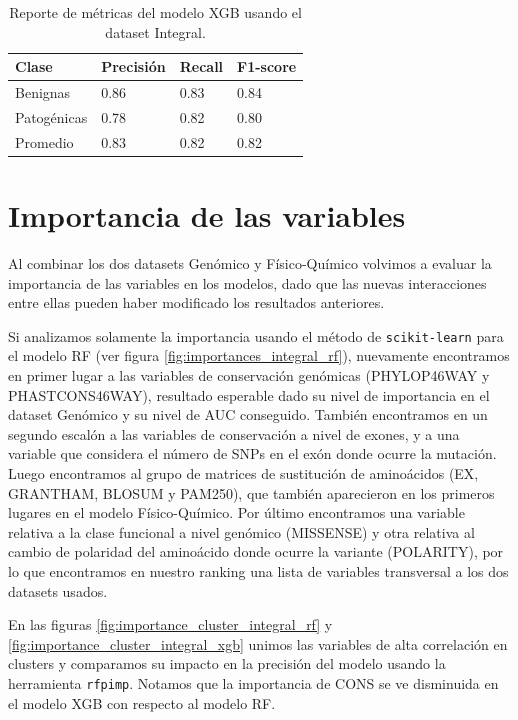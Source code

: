 \begin{table}[H]
\centering
\begin{tabular}{|l|l|l|l|}
\hline
Clase        & Precisión & Recall & F1-score \\ \hline
Benignas     & 0.86      & 0.83   & 0.84     \\ \hline
Patogénicas  & 0.78      & 0.82   & 0.80     \\ \hline
Promedio     & 0.83      & 0.82   & 0.82     \\ \hline
\end{tabular}
\caption{Reporte de métricas del modelo XGB usando el dataset Integral.}
\label{tab:metrics_integral_xgb}
\end{table}

\section{Importancia de las variables}

Al combinar los dos datasets Genómico y Físico-Químico volvimos a evaluar la importancia de las variables en los modelos, dado que las nuevas interacciones entre ellas pueden haber modificado los resultados anteriores. 

Si analizamos solamente la importancia usando el método de \texttt{scikit-learn} para el modelo RF (ver figura \ref{fig:importances_integral_rf}), nuevamente encontramos en primer lugar a las variables de conservación genómicas (PHYLOP46WAY y PHASTCONS46WAY), resultado esperable dado su nivel de importancia en el dataset Genómico y su nivel de AUC conseguido. También encontramos en un segundo escalón a las variables de conservación a nivel de exones, y a una variable que considera el número de SNPs en el exón donde ocurre la mutación. Luego encontramos al grupo de matrices de sustitución de aminoácidos (EX, GRANTHAM, BLOSUM y PAM250), que también aparecieron en los primeros lugares en el modelo Físico-Químico. Por último encontramos una variable relativa a la clase funcional a nivel genómico (MISSENSE) y otra relativa al cambio de polaridad del aminoácido donde ocurre la variante (POLARITY), por lo que encontramos en nuestro ranking una lista de variables transversal a los dos datasets usados. 


En las figuras \ref{fig:importance_cluster_integral_rf} y \ref{fig:importance_cluster_integral_xgb} unimos las variables de alta correlación en clusters y comparamos su impacto en la precisión del modelo usando la herramienta \texttt{rfpimp}. Notamos que la importancia de CONS se ve disminuida en el modelo XGB con respecto al modelo RF.


